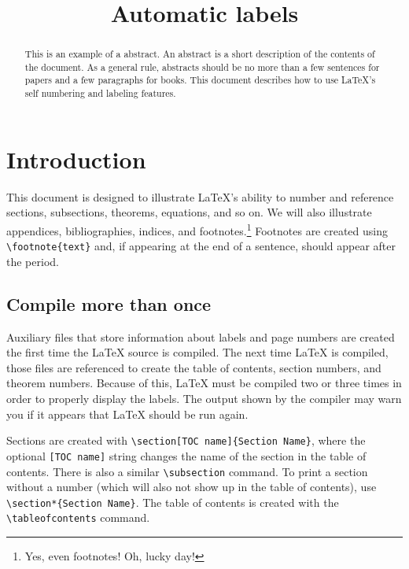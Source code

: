\documentclass{article}
\title{Automatic labels}
\date{}
\begin{document}
\maketitle

\begin{abstract}
  This is an example of a abstract.   An abstract is a short
  description of the contents of the document.  As a general rule, abstracts
  should be no more than a few sentences for papers and a few paragraphs for
  books.  This document describes how to use \LaTeX{'s} self numbering and
  labeling features.
\end{abstract}

\tableofcontents

\section{Introduction}

This document is designed to illustrate \LaTeX{'s} ability to number and
reference sections, subsections, theorems, equations, and so on.  We will also
illustrate appendices, bibliographies, indices, and footnotes.\footnote{Yes,
  even footnotes!  Oh, lucky day!}  Footnotes  are created
using \verb~\footnote{text}~ and, if appearing at the end of a sentence, should
appear after the period.

\subsection{Compile more than once}

Auxiliary files that store information about labels and page numbers are
created the first time the \LaTeX{} source is compiled.  The next time \LaTeX{}
is compiled, those files are referenced to create the table of contents,
section numbers, and theorem numbers.  Because of this, \LaTeX{} must be
compiled two or three times in order to properly display the labels.  The
output shown by the compiler may warn you if it appears that \LaTeX{} should be
run again.

Sections  are created with
\verb~\section[TOC name]{Section Name}~, where the optional \verb~[TOC name]~
string changes the name of the section in the table of contents.  There is also
a similar  \verb~\subsection~ command.  To print a section
without a number (which will also not show up in the table of contents), use
\verb~\section*{Section Name}~.  The table of contents is created with the
\verb~\tableofcontents~ command.
\end{document}
